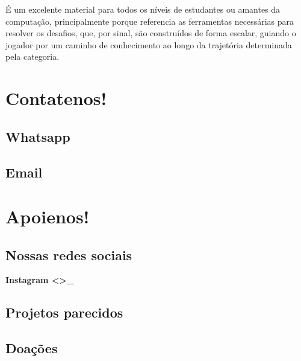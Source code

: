\documentclass[letterpaper,10pt,portuges]{sphinxmanual}
\begin{document}
\sphinxAtStartPar
É um excelente material para todos os níveis de estudantes ou amantes da computação, principalmente porque referencia as ferramentas necessárias para resolver os desafios, que, por sinal, são construídos de forma escalar, guiando o jogador por um caminho de conhecimento ao longo da trajetória determinada pela categoria.

\sphinxstepscope


\chapter{Contate\sphinxhyphen{}nos!}
\label{\detokenize{contact:contate-nos}}\label{\detokenize{contact::doc}}

\section{Whatsapp}
\label{\detokenize{contact:whatsapp}}

\section{Email}
\label{\detokenize{contact:email}}
\sphinxstepscope


\chapter{Apoie\sphinxhyphen{}nos!}
\label{\detokenize{support:apoie-nos}}\label{\detokenize{support::doc}}

\section{Nossas redes sociais}
\label{\detokenize{support:nossas-redes-sociais}}
\sphinxAtStartPar
{\color{red}\bfseries{}\textasciigrave{}Instagram \textless{}\textgreater{}\textasciigrave{}\_}


\section{Projetos parecidos}
\label{\detokenize{support:projetos-parecidos}}

\section{Doações}
\label{\detokenize{support:doacoes}}


\renewcommand{\indexname}{Índice}
\printindex
\end{document}
